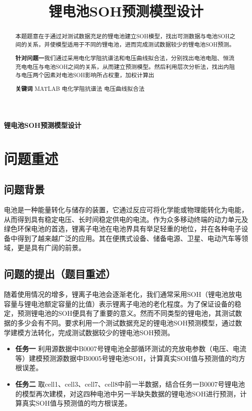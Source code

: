 \documentclass{cumcm}
\title{锂电池SOH预测模型设计}
\begin{document}
 

\begin{minipage}{0.9\textwidth}
\centering\LARGE\textbf{锂电池SOH预测模型设计}
\end{minipage}
\begin{abstract}
本题题意在于通过对测试数据充足的锂电池建立SOH模型，找出可测数据与电池SOH之间的关系，并使模型适用于不同的锂电池，进而完成测试数据较少的锂电池SOH预测。\par
\textbf{针对问题一}\quad 我们通过采用电化学阻抗谱法和电压曲线拟合法，分别找出电池电阻、恒流充电电压与电池SOH之间的关系，从而建立预测模型。然后利用层次分析法，找出内阻与电压两个因素对电池SOH影响所占权重，加权计算出


\textbf{关键词} \quad MATLAB \quad 电化学阻抗谱法  \quad 电压曲线拟合法
\end{abstract}

\newpage
\section{问题重述}
\subsection{问题背景}
电池是一种能量转化与储存的装置，它通过反应可将化学能或物理能转化为电能，从而得到具有稳定电压、长时间稳定供电的电流。作为众多移动终端的动力单元及绿色环保电池的首选，锂离子电池在电池界具有举足轻重的地位，并在各种电子设备中得到了越来越广泛的应用。其在便携式设备、储备电源、卫星、电动汽车等领域，更是具有广阔的前景。
\subsection{问题的提出（题目重述）}
随着使用情况的增多，锂离子电池会逐渐老化，我们通常采用SOH（锂电池放电容量与锂电池额定容量的比值）表示锂离子电池的老化程度。为了保证设备的稳定，预测锂电池的SOH便具有了重要的意义。然而不同类型的锂电池，其测试数据的多少会有不同。要求利用一个测试数据充足的锂电池SOH预测模型，通过数学建模方法转化，完成测试数据较少的锂电池SOH预测。

\begin{itemize}
\item \textbf{任务一} \quad 利用源数据中B0007号锂电池全部循环测试的充放电参数（电压、电流等）建模预测源数据中B0005号锂电池SOH，计算真实SOH值与预测值的均方根误差。
\item \textbf{任务二} \quad 取cell1、cell3、cell7、cell8中前一半数据，结合任务一B0007号锂电池的模型再次建模，对这四种电池中另一半缺失数据的锂电池SOH进行预测，计算真实SOH值与预测值的均方根误差。
\end{itemize}
\end{document}
